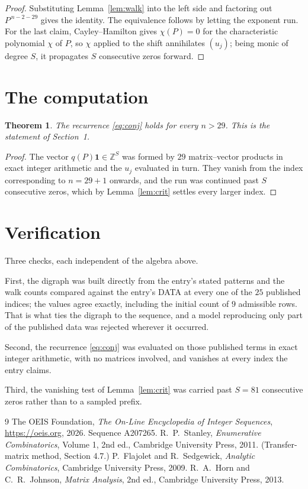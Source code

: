 \documentclass[11pt,a4paper]{article}
\theoremstyle{plain}
\newtheorem{theorem}{Theorem}
\theoremstyle{definition}
\begin{document}
\begin{proof}
Substituting Lemma~\ref{lem:walk} into the left side and factoring out
$P^{\,n-2-29}$ gives the identity. The equivalence follows by letting the exponent
run. For the last claim, Cayley--Hamilton gives $\chi(P)=0$ for the characteristic
polynomial $\chi$ of $P$, so $\chi$ applied to the shift annihilates $(u_j)$; being monic of
degree $S$, it propagates $S$ consecutive zeros forward.
\end{proof}

\section{The computation}

\begin{theorem}
The recurrence \eqref{eq:conj} holds for every $n>29$. This is the statement of
Section~1.
\end{theorem}

\begin{proof}
The vector $q(P)\mathbf{1}\in\mathbb{Z}^{S}$ was formed by $29$ matrix--vector
products in exact integer arithmetic and the $u_j$ evaluated in turn. They vanish from the
index corresponding to $n=29+1$ onwards, and the run was continued past $S$ consecutive
zeros, which by Lemma~\ref{lem:crit} settles every larger index.
\end{proof}

\section{Verification}

Three checks, each independent of the algebra above.

First, the digraph was built directly from the entry's stated patterns and the walk counts
compared against the entry's DATA at every one of the $25$ published indices; the
values agree exactly, including the initial count of $9$ admissible rows. That is
what ties the digraph to the sequence, and a model reproducing only part of the published
data was rejected wherever it occurred.

Second, the recurrence \eqref{eq:conj} was evaluated on those published terms in exact
integer arithmetic, with no matrices involved, and vanishes at every index the entry claims.

Third, the vanishing test of Lemma~\ref{lem:crit} was carried past $S=81$ consecutive
zeros rather than to a sampled prefix.

\begin{thebibliography}{9}
 The OEIS Foundation, \emph{The On-Line Encyclopedia of Integer
Sequences}, \url{https://oeis.org}, 2026. Sequence A207265.
 R.~P.~Stanley, \emph{Enumerative Combinatorics}, Volume 1, 2nd ed.,
Cambridge University Press, 2011. (Transfer-matrix method, Section 4.7.)
 P.~Flajolet and R.~Sedgewick, \emph{Analytic Combinatorics}, Cambridge
University Press, 2009.
 R.~A.~Horn and C.~R.~Johnson, \emph{Matrix Analysis}, 2nd ed., Cambridge
University Press, 2013.
\end{thebibliography}
\end{document}
